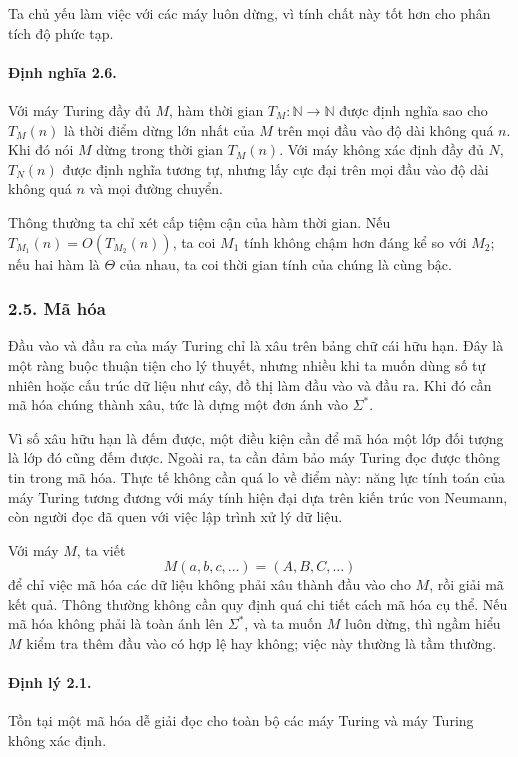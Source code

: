 \documentclass[11pt]{article}
\begin{document}
Ta chủ yếu làm việc với các máy luôn dừng, vì tính chất này tốt hơn cho phân
tích độ phức tạp.

\paragraph{Định nghĩa 2.6.}
Với máy Turing đầy đủ \(M\), hàm thời gian \(T_M:\mathbb N\to\mathbb N\) được
định nghĩa sao cho \(T_M(n)\) là thời điểm dừng lớn nhất của \(M\) trên mọi đầu
vào độ dài không quá \(n\). Khi đó nói \(M\) dừng trong thời gian \(T_M(n)\).
Với máy không xác định đầy đủ \(N\), \(T_N(n)\) được định nghĩa tương tự, nhưng
lấy cực đại trên mọi đầu vào độ dài không quá \(n\) và mọi đường chuyển.

Thông thường ta chỉ xét cấp tiệm cận của hàm thời gian. Nếu
\(T_{M_1}(n)=O(T_{M_2}(n))\), ta coi \(M_1\) tính không chậm hơn đáng kể so với
\(M_2\); nếu hai hàm là \(\Theta\) của nhau, ta coi thời gian tính của chúng là
cùng bậc.

\subsubsection*{2.5. Mã hóa}

Đầu vào và đầu ra của máy Turing chỉ là xâu trên bảng chữ cái hữu hạn. Đây là
một ràng buộc thuận tiện cho lý thuyết, nhưng nhiều khi ta muốn dùng số tự
nhiên hoặc cấu trúc dữ liệu như cây, đồ thị làm đầu vào và đầu ra. Khi đó cần
mã hóa chúng thành xâu, tức là dựng một đơn ánh vào \(\Sigma^*\).

Vì số xâu hữu hạn là đếm được, một điều kiện cần để mã hóa một lớp đối tượng là
lớp đó cũng đếm được. Ngoài ra, ta cần đảm bảo máy Turing đọc được thông tin
trong mã hóa. Thực tế không cần quá lo về điểm này: năng lực tính toán của máy
Turing tương đương với máy tính hiện đại dựa trên kiến trúc von Neumann, còn
người đọc đã quen với việc lập trình xử lý dữ liệu.

Với máy \(M\), ta viết
\[
  M(a,b,c,\ldots)=(A,B,C,\ldots)
\]
để chỉ việc mã hóa các dữ liệu không phải xâu thành đầu vào cho \(M\), rồi giải
mã kết quả. Thông thường không cần quy định quá chi tiết cách mã hóa cụ thể.
Nếu mã hóa không phải là toàn ánh lên \(\Sigma^*\), và ta muốn \(M\) luôn dừng,
thì ngầm hiểu \(M\) kiểm tra thêm đầu vào có hợp lệ hay không; việc này thường
là tầm thường.

\paragraph{Định lý 2.1.}
Tồn tại một mã hóa dễ giải đọc cho toàn bộ các máy Turing và máy Turing không
xác định.
\end{document}
